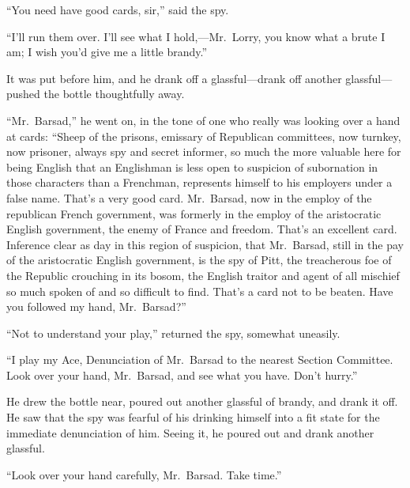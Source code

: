 ``You need have good cards, sir,'' said the spy.

``I'll run them over.  I'll see what I hold,---Mr.\ Lorry, you know
what a brute I am; I wish you'd give me a little brandy.''

It was put before him, and he drank off a glassful---drank off another
glassful---pushed the bottle thoughtfully away.

``Mr.\ Barsad,'' he went on, in the tone of one who really was looking
over a hand at cards:  ``Sheep of the prisons, emissary of Republican
committees, now turnkey, now prisoner, always spy and secret
informer, so much the more valuable here for being English that an
Englishman is less open to suspicion of subornation in those
characters than a Frenchman, represents himself to his employers
under a false name. That's a very good card.  Mr.\ Barsad, now in the
employ of the republican French government, was formerly in the
employ of the aristocratic English government, the enemy of France
and freedom.  That's an excellent card.  Inference clear as day in
this region of suspicion, that Mr.\ Barsad, still in the pay of the
aristocratic English government, is the spy of Pitt, the treacherous
foe of the Republic crouching in its bosom, the English traitor and
agent of all mischief so much spoken of and so difficult to find.
That's a card not to be beaten.  Have you followed my hand, Mr.\ Barsad?''

``Not to understand your play,'' returned the spy, somewhat uneasily.

``I play my Ace, Denunciation of Mr.\ Barsad to the nearest Section
Committee.  Look over your hand, Mr.\ Barsad, and see what you have.
Don't hurry.''

He drew the bottle near, poured out another glassful of brandy,
and drank it off.  He saw that the spy was fearful of his drinking
himself into a fit state for the immediate denunciation of him.
Seeing it, he poured out and drank another glassful.

``Look over your hand carefully, Mr.\ Barsad.  Take time.''

